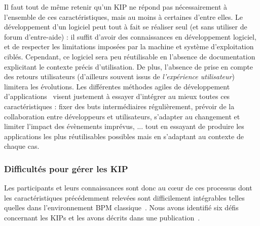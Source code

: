 Il faut tout de même retenir qu'un KIP ne répond pas nécessairement à l'ensemble de ces caractéristiques, mais au moins à certaines d'entre elles.
Le développement d'un logiciel peut tout à fait se réaliser seul (et sans utiliser de forum d'entre-aide) : il suffit d'avoir des connaissances en développement logiciel, et de respecter les limitations imposées par la machine et système d'exploitation ciblés.
Cependant, ce logiciel sera peu réutilisable en l'absence de documentation explicitant le contexte précis d'utilisation.
De plus, l'absence de prise en compte des retours utilisateurs (d'ailleurs souvent issus de \textit{l'expérience utilisateur}) limitera les évolutions.
Les différentes méthodes agiles de développement d'applications~\cite{fowler2001agile} visent justement à essayer d'intégrer au mieux toutes ces caractéristiques : fixer des buts intermédiaires régulièrement, prévoir de la collaboration entre développeurs et utilisateurs, s'adapter au changement et limiter l'impact des évènements imprévus, ... tout en essayant de produire les applications les plus réutilisables possibles mais en s'adaptant au contexte de chaque cas.


\bigskip


\subsubsection{Difficultés pour gérer les KIP}
\label{subsubsection:Contexte:KIP-RevueLitterature:KIP:DifficulteGestionKIP}

Les participants et leurs connaissances sont donc au c\oe{}ur de ces processus dont les caractéristiques précédemment relevées sont difficilement intégrables telles quelles dans l'environnement BPM classique~\cite{riss2005challenges}\cite{moura2013collaboration}.
Nous avons identifié six défis concernant les KIPs et les avons décrits dans une publication~\cite{boissier2019challenges}.

